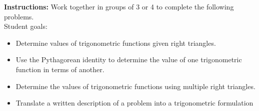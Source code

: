 




\noindent \textbf{Instructions:}  Work together in groups of  3 or 4 to complete the following problems.\\

Student goals:
\begin{itemize}
\item Determine values of trigonometric functions given right triangles.
\item Use the Pythagorean identity to determine the value of one
  trigonometric function in terms of another.
\item Determine the values of trigonometric functions using multiple
  right triangles.
\item Translate a written description of a problem into a
  trigonometric formulation
\end{itemize}

\newcommand{\trigTriangle}[5]{%
	\begin{tikzpicture}[scale=2.5]
	\draw (0,0) -- (2,0) -- (2,1) -- (0,0);
	\draw (1.9,0) -- (1.9,0.1) -- (2,0.1);
	\draw (0.3,0) arc(0:40:0.2);
	\draw (0.5,0.1) node { #1 };
	\draw (1.8,0.7) node { #2 };
	\draw (1,-0.1) node { #3 };
	\draw (1,0.6) node { #4 };
	\draw (2,0.8) arc(270:210:0.2);
	\draw (2.1,0.5) node { #5 };
	\end{tikzpicture}
}

